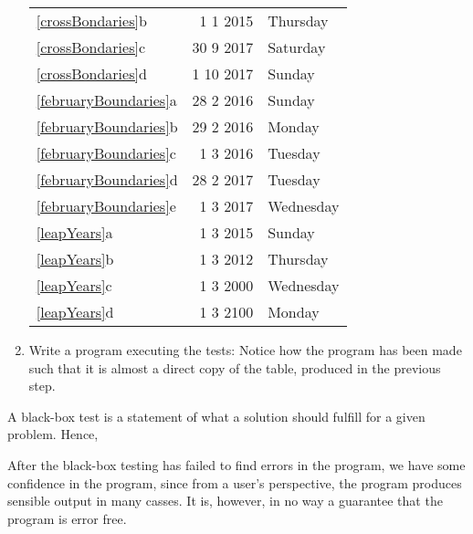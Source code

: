 \begin{enumerate}[label=]
\begin{center}
\begin{tabular}{|l|r|l|}
    \ref{crossBondaries}b&1 1 2015&Thursday\\
    \ref{crossBondaries}c&30 9 2017&Saturday\\
    \ref{crossBondaries}d&1 10 2017&Sunday\\
    \hline
    \ref{februaryBoundaries}a&28 2 2016&Sunday\\
    \ref{februaryBoundaries}b&29 2 2016&Monday\\
    \ref{februaryBoundaries}c&1 3 2016&Tuesday\\
    \ref{februaryBoundaries}d&28 2 2017&Tuesday\\
    \ref{februaryBoundaries}e&1 3 2017&Wednesday\\
    \hline
    \ref{leapYears}a&1 3 2015&Sunday\\
    \ref{leapYears}b&1 3 2012&Thursday\\
    \ref{leapYears}c&1 3 2000&Wednesday\\
    \ref{leapYears}d&1 3 2100&Monday\\
    \hline
  \end{tabular}
\end{center}
\item Write a program executing the tests:
  Notice how the program has been made such that it is almost a direct copy of the table, produced in the previous step.
\end{enumerate}
A black-box test is a statement of what a solution should fulfill for a given problem. Hence, 

After the black-box testing has failed to find errors in the program, we have some confidence in the program, since from a user's perspective, the program produces sensible output in many casses. It is, however, in no way a guarantee that the program is error free.

